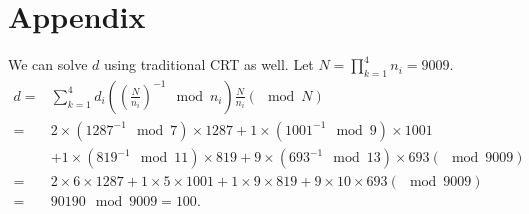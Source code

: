 \documentclass[12pt]{article}
\theoremstyle{plain}
\begin{document}
\section{Appendix}
We can solve $d$ using traditional CRT as well. 
Let $N = \prod_{k=1}^4 n_i = 9009$.
$$\begin{aligned}
d =& \sum_{k=1}^4 d_i \left(\left(\frac{N}{n_i}\right)^{-1} \mod n_i \right) \frac{N}{n_i}  (\mod N)\\
=& 2\times(1287^{-1} \mod 7)\times 1287 + 1\times(1001^{-1} \mod 9)\times 1001 \\
&+ 1\times(819^{-1} \mod 11)\times 819 + 9\times(693^{-1} \mod 13)\times 693 (\mod 9009)\\
=& 2\times 6\times 1287 + 1\times 5\times 1001 + 1\times 9\times 819 + 9\times 10\times 693 (\mod 9009)\\
=& 90190 \mod 9009 = 100.
\end{aligned}$$
\end{document}
